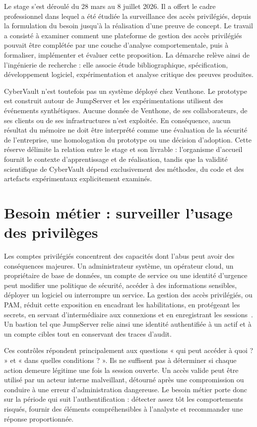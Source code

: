 \documentclass[11pt,a4paper,oneside]{report}
\theoremstyle{definition}
\theoremstyle{plain}
\begin{document}
Le stage s'est déroulé du 28 mars au 8 juillet 2026. Il a offert le cadre
professionnel dans lequel a été étudiée la surveillance des accès privilégiés,
depuis la formulation du besoin jusqu'à la réalisation d'une preuve de
concept. Le travail a consisté à examiner comment une plateforme de gestion
des accès privilégiés pouvait être complétée par une couche d'analyse
comportementale, puis à formaliser, implémenter et évaluer cette proposition.
La démarche relève ainsi de l'ingénierie de recherche : elle associe étude
bibliographique, spécification, développement logiciel, expérimentation et
analyse critique des preuves produites.

CyberVault n'est toutefois pas un système déployé chez Venthone. Le prototype
est construit autour de JumpServer et les expérimentations utilisent des
événements synthétiques. Aucune donnée de Venthone, de ses collaborateurs, de
ses clients ou de ses infrastructures n'est exploitée. En conséquence, aucun
résultat du mémoire ne doit être interprété comme une évaluation de la sécurité
de l'entreprise, une homologation du prototype ou une décision d'adoption.
Cette réserve délimite la relation entre le stage et son livrable : l'organisme
d'accueil fournit le contexte d'apprentissage et de réalisation, tandis que la
validité scientifique de CyberVault dépend exclusivement des méthodes, du
code et des artefacts expérimentaux explicitement examinés.

\section{Besoin métier : surveiller l'usage des privilèges}
\label{sec:intro-motivation}

Les comptes privilégiés concentrent des capacités dont l'abus peut avoir des
conséquences majeures. Un administrateur système, un opérateur cloud, un
propriétaire de base de données, un compte de service ou une identité
d'urgence peut modifier une politique de sécurité, accéder à des informations
sensibles, déployer un logiciel ou interrompre un service. La gestion des
accès privilégiés, ou PAM, réduit cette exposition en encadrant les
habilitations, en protégeant les secrets, en servant d'intermédiaire aux
connexions et en enregistrant les sessions~\cite{ref1,ref2,ref5}. Un bastion
tel que JumpServer relie ainsi une identité authentifiée à un actif et à un
compte cibles tout en conservant des traces d'audit.

Ces contrôles répondent principalement aux questions « qui peut accéder à
quoi ? » et « dans quelles conditions ? ». Ils ne suffisent pas à déterminer
si chaque action demeure légitime une fois la session ouverte. Un accès
valide peut être utilisé par un acteur interne malveillant, détourné après une
compromission ou conduire à une erreur d'administration dangereuse. Le besoin
métier porte donc sur la période qui suit l'authentification : détecter assez
tôt les comportements risqués, fournir des éléments compréhensibles à
l'analyste et recommander une réponse proportionnée.
\end{document}
